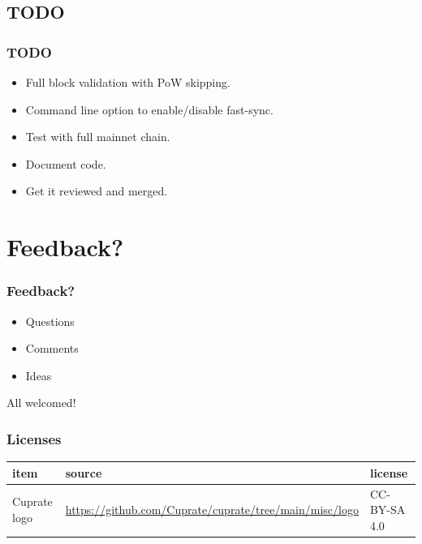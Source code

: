 \documentclass[aspectratio=169]{beamer}
\begin{document}
\subsection{TODO}
\begin{frame}[fragile]
  \frametitle{TODO}
  \begin{itemize}
    \item Full block validation with PoW skipping.
    \item Command line option to enable/disable fast-sync.
    \item Test with full mainnet chain.
    \item Document code.
    \item Get it reviewed and merged.
  \end{itemize}
\end{frame}

\section{Feedback?}
\begin{frame}
  \frametitle{Feedback?}
  \begin{itemize}
    \setlength\itemsep{1em}
    \item Questions
    \item Comments
    \item Ideas
  \end{itemize}
  \vspace{2em}
  All welcomed!
\end{frame}

\begin{frame}
  \frametitle{Licenses}
  {\scriptsize
    \begin{tabular}{l | l | l}
      item & source & license \\
      \hline
      Cuprate logo & \url{https://github.com/Cuprate/cuprate/tree/main/misc/logo} & CC-BY-SA 4.0 \\
    \end{tabular}
  }
\end{frame}
\end{document}
